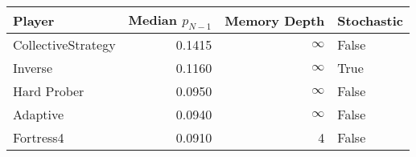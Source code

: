\begin{tabular}{lrrl}
\toprule
             Player &  Median $p_{N-1}$ &  Memory Depth & Stochastic \\
\midrule
 CollectiveStrategy &            0.1415 &            \(\infty\) &      False \\
            Inverse &            0.1160 &            \(\infty\) &       True \\
        Hard Prober &            0.0950 &            \(\infty\) &      False \\
           Adaptive &            0.0940 &            \(\infty\) &      False \\
          Fortress4 &            0.0910 &             4 &      False \\
\bottomrule
\end{tabular}
